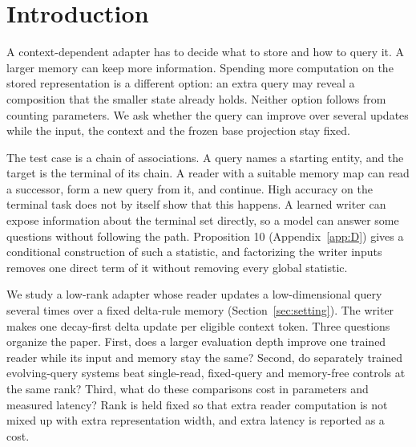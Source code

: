 \section{Introduction}

A context-dependent adapter has to decide what to store and how to query it.
A larger memory can keep more information.
Spending more computation on the stored representation is a different option: an extra query may reveal a composition that the smaller state already holds.
Neither option follows from counting parameters.
We ask whether the query can improve over several updates while the input, the context and the frozen base projection stay fixed.

The test case is a chain of associations.
A query names a starting entity, and the target is the terminal of its chain.
A reader with a suitable memory map can read a successor, form a new query from it, and continue.
High accuracy on the terminal task does not by itself show that this happens.
A learned writer can expose information about the terminal set directly, so a model can answer some questions without following the path.
Proposition 10 (Appendix~\ref{app:D}) gives a conditional construction of such a statistic, and factorizing the writer inputs removes one direct term of it without removing every global statistic.

We study a low-rank adapter whose reader updates a low-dimensional query several times over a fixed delta-rule memory (Section~\ref{sec:setting}).
The writer makes one decay-first delta update per eligible context token.
Three questions organize the paper.
First, does a larger evaluation depth improve one trained reader while its input and memory stay the same?
Second, do separately trained evolving-query systems beat single-read, fixed-query and memory-free controls at the same rank?
Third, what do these comparisons cost in parameters and measured latency?
Rank is held fixed so that extra reader computation is not mixed up with extra representation width, and extra latency is reported as a cost.  %

